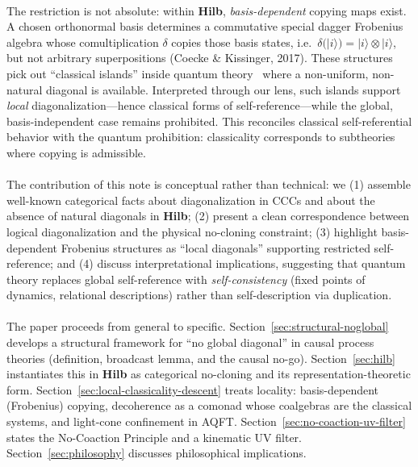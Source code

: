 \documentclass[11pt]{article}
\theoremstyle{upright}
\begin{document}
\paragraph{}
The restriction is not absolute: within \textbf{Hilb}, \emph{basis-dependent} copying maps exist. A chosen orthonormal basis determines a commutative special dagger Frobenius algebra whose comultiplication $\delta$ copies those basis states, i.e.\ $\delta(|i\rangle) = |i\rangle \otimes |i\rangle$, but not arbitrary superpositions (Coecke \& Kissinger, 2017). These structures pick out ``classical islands'' inside quantum theory~\cite{CoeckeKissinger2017} where a non-uniform, non-natural diagonal is available. Interpreted through our lens, such islands support \emph{local} diagonalization---hence classical forms of self-reference---while the global, basis-independent case remains prohibited. This reconciles classical self-referential behavior with the quantum prohibition: classicality corresponds to subtheories where copying is admissible.

\paragraph{}
The contribution of this note is conceptual rather than technical: we (1) assemble well-known categorical facts about diagonalization in CCCs and about the absence of natural diagonals in \textbf{Hilb}; (2) present a clean correspondence between logical diagonalization and the physical no-cloning constraint; (3) highlight basis-dependent Frobenius structures as ``local diagonals'' supporting restricted self-reference; and (4) discuss interpretational implications, suggesting that quantum theory replaces global self-reference with \emph{self-consistency} (fixed points of dynamics, relational descriptions) rather than self-description via duplication.

\paragraph{}
The paper proceeds from general to specific. Section~\ref{sec:structural-noglobal} develops a structural framework for ``no global diagonal'' in causal process theories (definition, broadcast lemma, and the causal no-go). Section~\ref{sec:hilb} instantiates this in \textbf{Hilb} as categorical no-cloning and its representation-theoretic form. Section~\ref{sec:local-classicality-descent} treats locality: basis-dependent (Frobenius) copying, decoherence as a comonad whose coalgebras are the classical systems, and light-cone confinement in AQFT. Section~\ref{sec:no-coaction-uv-filter} states the No-Coaction Principle and a kinematic UV filter. Section~\ref{sec:philosophy} discusses philosophical implications.
\end{document}
